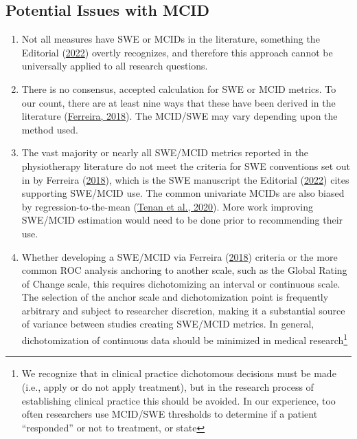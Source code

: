 \documentclass[]{cik}%
\begin{document}
\hypertarget{potential-issues-with-mcid}{%
\subsection{Potential Issues with
MCID}\label{potential-issues-with-mcid}}

\begin{enumerate}
\def\labelenumi{\arabic{enumi}.}
\tightlist
\item
  Not all measures have SWE or MCIDs in the literature, something the
  Editorial (\protect\hyperlink{ref-elkins2022}{2022}) overtly
  recognizes, and therefore this approach cannot be universally applied
  to all research questions.
\item
  There is no consensus, accepted calculation for SWE or MCID metrics.
  To our count, there are at least nine ways that these have been
  derived in the literature
  (\protect\hyperlink{ref-ferreira2018}{Ferreira, 2018}). The MCID/SWE
  may vary depending upon the method used.
\item
  The vast majority or nearly all SWE/MCID metrics reported in the
  physiotherapy literature do not meet the criteria for SWE conventions
  set out in by Ferreira (\protect\hyperlink{ref-ferreira2018}{2018}),
  which is the SWE manuscript the Editorial
  (\protect\hyperlink{ref-elkins2022}{2022}) cites supporting SWE/MCID
  use. The common univariate MCIDs are also biased by
  regression-to-the-mean (\protect\hyperlink{ref-tenan2020}{Tenan et
  al., 2020}). More work improving SWE/MCID estimation would need to be
  done prior to recommending their use.
\item
  Whether developing a SWE/MCID via Ferreira
  (\protect\hyperlink{ref-ferreira2018}{2018}) criteria or the more
  common ROC analysis anchoring to another scale, such as the Global
  Rating of Change scale, this requires dichotomizing an interval or
  continuous scale. The selection of the anchor scale and
  dichotomization point is frequently arbitrary and subject to
  researcher discretion, making it a substantial source of variance
  between studies creating SWE/MCID metrics. In general, dichotomization
  of continuous data should be minimized in medical research\footnote{We
    recognize that in clinical practice dichotomous decisions must be
    made (i.e., apply or do not apply treatment), but in the research
    process of establishing clinical practice this should be avoided. In
    our experience, too often researchers use MCID/SWE thresholds to
    determine if a patient ``responded'' or not to treatment, or state
}
\end{enumerate}
\end{document}
